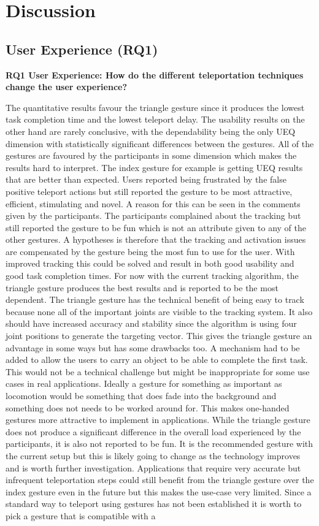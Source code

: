 \chapter{Discussion} %
\label{cha:Discussion}

\section{User Experience (RQ1)}
\textbf{RQ1 User Experience: How do the different teleportation techniques change the user experience?}

The quantitative results favour the triangle gesture since it produces the lowest task completion time and the lowest teleport delay. The usability results on the other hand are rarely conclusive, with the dependability being the only UEQ dimension with statistically significant differences between the gestures. All of the gestures are favoured by the participants in some dimension which makes the results hard to interpret. The index gesture for example is getting UEQ results that are better than expected. Users reported being frustrated by the false positive teleport actions but still reported the gesture to be most attractive, efficient, stimulating and novel. A reason for this can be seen in the comments given by the participants. The participants complained about the tracking but still reported the gesture to be fun which is not an attribute given to any of the other gestures. A hypotheses is therefore that the tracking and activation issues are compensated by the gesture being the most fun to use for the user. With improved tracking this could be solved and result in both good usability and good task completion times. For now with the current tracking algorithm, the triangle gesture produces the best results and is reported to be the most dependent. The triangle gesture has the technical benefit of being easy to track because none all of the important joints are visible to the tracking system. It also should have increased accuracy and stability since the algorithm is using four joint positions to generate the targeting vector. This gives the triangle gesture an advantage in some ways but has some drawbacks too. A mechanism had to be added to allow the users to carry an object to be able to complete the first task. This would not be a technical challenge but might be inappropriate for some use cases in real applications. Ideally a gesture for something as important as locomotion would be something that does fade into the background and something does not needs to be worked around for. This makes one-handed gestures more attractive to implement in applications. While the triangle gesture does not produce a significant difference in the overall load experienced by the participants, it is also not reported to be fun. It is the recommended gesture with the current setup but this is likely going to change as the technology improves and is worth further investigation. Applications that require very accurate but infrequent teleportation steps could still benefit from the triangle gesture over the index gesture even in the future but this makes the use-case very limited. Since a standard way to teleport using gestures has not been established it is worth to pick a gesture that is compatible with a 